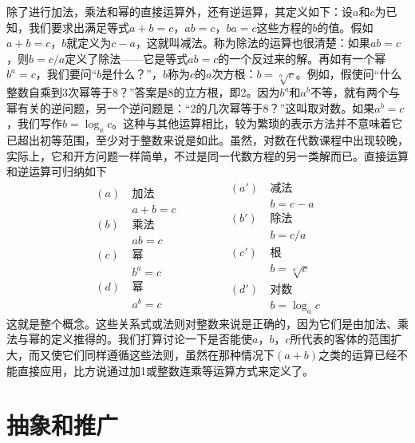 除了进行加法，乘法和幂的直接运算外，还有逆运算，其定义如下：设$a$和$c$为已知，我们要求出满足等式$a+b=c$，$ab=c$，$ba=c$这些方程的$b$的值。假如$a+b=c$，$b$就定义为$c-a$，这就叫减法。称为除法的运算也很清楚：如果$ab=c$，则$b=c/a$定义了除法——它是等式$ab=c$的一个反过来的解。再如有一个幂$b^a=c$，我们要问“$b$是什么？”，$b$称为$c$的$a$次方根：$b=\sqrt[a]{c}$。例如，假使问“什么整数自乘到3次幂等于8？”答案是8的立方根，即2。因为$b^a$和$a^b$不等，就有两个与幂有关的逆问题，另一个逆问题是：“2的几次幂等于8？”这叫取对数。如果$a^b=c$，我们写作$b=\log_ac$。这种与其他运算相比，较为繁琐的表示方法并不意味着它已超出初等范围，至少对于整数来说是如此。虽然，对数在代数课程中出现较晚，实际上，它和开方问题一样简单，不过是同一代数方程的另一类解而已。直接运算和逆运算可归纳如下
\begin{equation}
    \label{Eq:I:22:2}
    \begin{aligned}
        (a)~&\text{加法} \\
        &a+b=c \\
        (b)~&\text{乘法} \\
        &ab=c \\
        (c)~&\text{幂} \\
        &b^a = c \\
        (d)~&\text{幂} \\
        &a^b=c
    \end{aligned}
    \qquad\qquad
    \begin{aligned}
        (a')~&\text{减法} \\
        &b = c - a \\
        (b')~&\text{除法} \\
        &b = c / a \\
        (c')~&\text{根} \\
        &b = \sqrt[a]{c} \\
        (d')~&\text{对数} \\
        &b = \log_a c
    \end{aligned}
\end{equation}
这就是整个概念。这些关系式或法则对整数来说是正确的，因为它们是由加法、乘法与幂的定义推得的。我们打算讨论一下是否能使$a$，$b$，$c$所代表的客体的范围扩大，而又使它们同样遵循这些法则，虽然在那种情况下$(a+b)$之类的运算已经不能直接应用，比方说通过加1或整数连乘等运算方式来定义了。

\section{抽象和推广}

